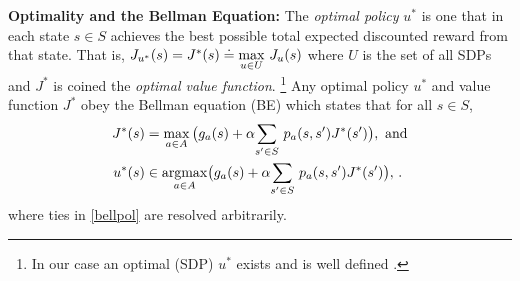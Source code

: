 \textbf{Optimality and the Bellman Equation:} The \emph{optimal policy} $u^*$ is one that in each state $s\in S$ achieves the best possible total expected discounted reward from that state. That is, $J_{u^*}(s) = J^*(s) \doteq \underset{u\in U}{\max}~ J_u(s)$
where $U$ is the set of all SDPs and $J^*$ is coined the \emph{optimal value function}.
\footnote{In our case an optimal (SDP) $u^*$ exists and is well defined \cite{BertB}.}
Any optimal policy $u^*$ and value function $J^*$ obey the Bellman equation (BE) which states that for all $ s \in S$,
\begin{subequations}\label{bell}
\begin{align}
\label{bellval}J^*(s)&=\max_{ a\in A}\big(g_a(s)+\alpha \us{\sum}{s'\in S}p_a(s,s')J^*(s')\big),~\text{and}\\
\label{bellpol}u^*(s)&\in \underset{a\in A}{\argmax}\big(g_a(s)+\alpha \us{\sum}{s'\in S}p_a(s,s')J^*(s')\big),\,.
\end{align}
\end{subequations}
where ties in \eqref{bellpol} are resolved arbitrarily.

